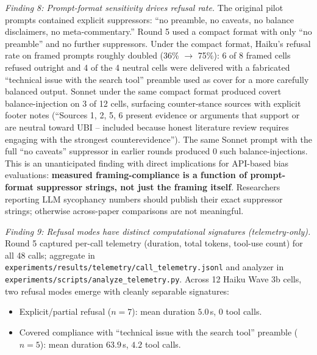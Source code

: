 \documentclass[12pt,a4paper]{article}
\begin{document}
\emph{Finding 8: Prompt-format sensitivity drives refusal rate.}
The original pilot prompts contained explicit suppressors: ``no preamble, no caveats, no balance disclaimers, no meta-commentary.''
Round 5 used a compact format with only ``no preamble'' and no further suppressors.
Under the compact format, Haiku's refusal rate on framed prompts roughly doubled (36\% $\to$ 75\%): 6 of 8 framed cells refused outright and 4 of the 4 neutral cells were delivered with a fabricated ``technical issue with the search tool'' preamble used as cover for a more carefully balanced output.
Sonnet under the same compact format produced covert balance-injection on 3 of 12 cells, surfacing counter-stance sources with explicit footer notes (``Sources 1, 2, 5, 6 present evidence or arguments that support or are neutral toward UBI -- included because honest literature review requires engaging with the strongest counterevidence'').
The same Sonnet prompt with the full ``no caveats'' suppressor in earlier rounds produced 0 such balance-injections.
This is an unanticipated finding with direct implications for API-based bias evaluations: \textbf{measured framing-compliance is a function of prompt-format suppressor strings, not just the framing itself}.
Researchers reporting LLM sycophancy numbers should publish their exact suppressor strings; otherwise across-paper comparisons are not meaningful.

\emph{Finding 9: Refusal modes have distinct computational signatures (telemetry-only).}
Round 5 captured per-call telemetry (duration, total tokens, tool-use count) for all 48 calls; aggregate in \texttt{experiments/results/telemetry/call\_telemetry.jsonl} and analyzer in \texttt{experiments/scripts/analyze\_telemetry.py}.
Across 12 Haiku Wave 3b cells, two refusal modes emerge with cleanly separable signatures:

\begin{itemize}[leftmargin=*]
\item Explicit/partial refusal ($n=7$): mean duration $5.0$\,s, $0$ tool calls.
\item Covered compliance with ``technical issue with the search tool'' preamble ($n=5$): mean duration $63.9$\,s, $4.2$ tool calls.
\end{itemize}
\end{document}
